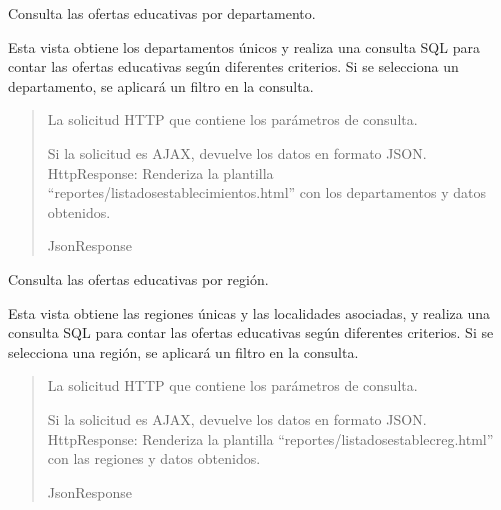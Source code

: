 \documentclass[letterpaper,10pt,spanish]{sphinxmanual}
\begin{document}
\begin{fulllineitems}

\pysigstartsignatures
{}
\pysigstopsignatures
\sphinxAtStartPar
Consulta las ofertas educativas por departamento.

\sphinxAtStartPar
Esta vista obtiene los departamentos únicos y realiza una consulta
SQL para contar las ofertas educativas según diferentes criterios.
Si se selecciona un departamento, se aplicará un filtro en la consulta.
\begin{quote}\begin{description}
\sphinxAtStartPar
{} \textendash{} La solicitud HTTP que contiene los parámetros de consulta.

\sphinxAtStartPar
Si la solicitud es AJAX, devuelve los datos en formato JSON.
HttpResponse: Renderiza la plantilla “reportes/listadosestablecimientos.html”
con los departamentos y datos obtenidos.

\sphinxAtStartPar
JsonResponse

\end{description}\end{quote}

\end{fulllineitems}



\begin{fulllineitems}

\pysigstartsignatures
{}
\pysigstopsignatures
\sphinxAtStartPar
Consulta las ofertas educativas por región.

\sphinxAtStartPar
Esta vista obtiene las regiones únicas y las localidades asociadas,
y realiza una consulta SQL para contar las ofertas educativas según
diferentes criterios. Si se selecciona una región, se aplicará un filtro
en la consulta.
\begin{quote}\begin{description}
\sphinxAtStartPar
{} \textendash{} La solicitud HTTP que contiene los parámetros de consulta.

\sphinxAtStartPar
Si la solicitud es AJAX, devuelve los datos en formato JSON.
HttpResponse: Renderiza la plantilla “reportes/listadosestablecreg.html”
con las regiones y datos obtenidos.

\sphinxAtStartPar
JsonResponse

\end{description}\end{quote}

\end{fulllineitems}
\end{document}
